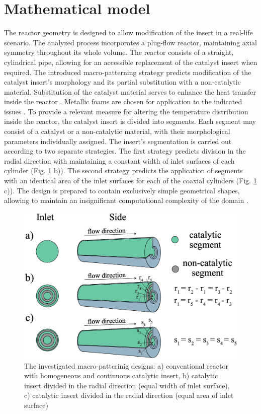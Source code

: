 \documentclass[preprint,12pt]{elsarticle}
\begin{document}
\section{Mathematical model}
\label{sec:math_model}

The reactor geometry is designed to allow modification of the insert in a real-life scenario. The analyzed process incorporates a plug-flow reactor, maintaining axial symmetry throughout its whole volume. The reactor consists of a straight, cylindrical pipe, allowing for an accessible replacement of the catalyst insert when required.  The introduced macro-patterning strategy predicts modification of the catalyst insert's morphology and its partial substitution with a non-catalytic material. Substitution of the catalyst material serves to enhance the heat transfer inside the reactor \cite{Pajak2018}. Metallic foams are chosen for application to the indicated issues \cite{Boomsma2003}. To provide a relevant measure for altering the temperature distribution inside the reactor, the catalyst insert is divided into segments. Each segment may consist of a catalyst or a non-catalytic material, with their morphological parameters individually assigned. The insert's segmentation is carried out according to two separate strategies. The first strategy predicts division in the radial direction with maintaining a constant width of inlet surfaces of each cylinder (Fig. \ref{fig:segments} b)). The second strategy predicts the application of segments with an identical area of the inlet surfaces for each of the coaxial cylinders (Fig. \ref{fig:segments} c)). The design is prepared to contain exclusively simple geometrical shapes, allowing to maintain an insignificant computational complexity of the domain \cite{Kaw2011}.  

\begin{figure}[h]
\centering
\includegraphics[width=120mm]{segments.eps}\hspace{2pc} 
\caption{\label{fig:segments} The investigated macro-patterinig designs: a) conventional reactor with homogeneous and continuous catalytic insert, b) catalytic insert divided in the radial direction (equal width of inlet surface),  c) catalytic insert divided in the radial direction  (equal area of inlet surface)}
\end{figure}
 
\end{document}
